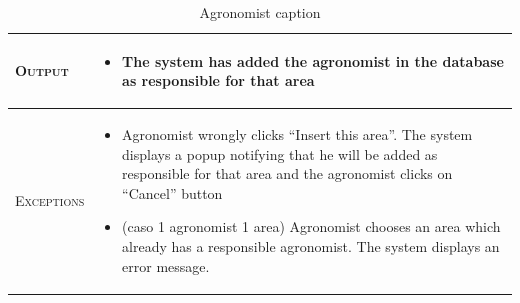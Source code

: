 \begin{table}[H]
\begin{tabular}[c]{|l|p{}|}
    	\hline %
    	\textsc{Output}             &  \begin{itemize}
    	    \item The system has added the agronomist in the database as responsible for that area
    	\end{itemize}\\
    	\hline %
    	\textsc{Exceptions}         &  \begin{itemize}
    	    \item Agronomist wrongly clicks “Insert this area”. The system displays a popup notifying that he will be added as responsible for that area and the agronomist clicks on “Cancel” button
    	    \item (caso 1 agronomist 1 area) Agronomist chooses an area which already has a responsible agronomist. The system displays an error message.
    	\end{itemize}\\
    	\hline %
        
    \end{tabular}
    \caption{\label{tab:responsible_area_insertion}Agronomist caption }
\end{table}

